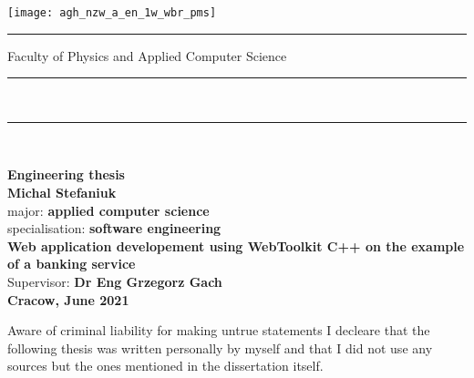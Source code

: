 \documentclass[a4paper,12pt]{article}
\begin{document}

\thispagestyle{empty}
\texttt{[image: agh\_nzw\_a\_en\_1w\_wbr\_pms]}\\
\rule{30mm}{0pt}{
{\large \textsf{Faculty of Physics and Applied Computer Science}}\\
\rule{\textwidth}{3pt}\\
\rule[2ex]
{\textwidth}{1pt}\\
\vspace{7ex}
\begin{center}
{\LARGE \bf \textsf{Engineering thesis}}\\
\vspace{13ex}
{\bf \Large \textsf{Michal Stefaniuk}}\\
\vspace{3ex}
{\small \sf major: {\bf \textsf{applied computer science}}}\\
\vspace{1.5ex}
{\small \sf specialisation: {\bf \textsf{software engineering}}}\\
\vspace{10ex}
{\bf \huge \textsf{Web application developement using WebToolkit
C++ on the example of a banking service}}\\
\vspace{14ex}
{\Large \sf Supervisor: {\bf \textsf{Dr Eng Grzegorz Gach}}}\\
\vspace{22ex}
{\large \bf \textsf{Cracow, June 2021}}
\end{center}

\newpage

Aware of criminal liability for making untrue statements I decleare that
the following thesis was written personally by myself and that I did not use
any sources but the ones mentioned in the dissertation itself.

}
\end{document}
